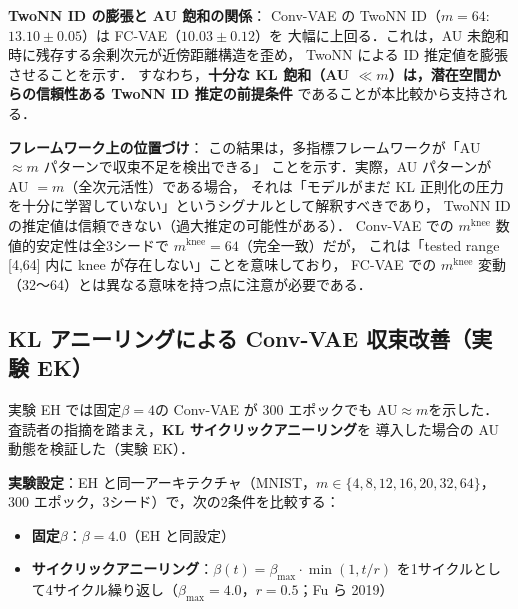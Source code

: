\documentclass[11pt,a4paper]{jsarticle}
\newcommand{\mknee}{m^{\mathrm{knee}}}
\begin{document}
\textbf{TwoNN ID の膨張と AU 飽和の関係}：
Conv-VAE の TwoNN ID（$m=64$: $13.10 \pm 0.05$）は FC-VAE（$10.03 \pm 0.12$）を
大幅に上回る．これは，AU 未飽和時に残存する余剰次元が近傍距離構造を歪め，
TwoNN による ID 推定値を膨張させることを示す．
すなわち，\textbf{十分な KL 飽和（AU $\ll m$）は，潜在空間からの信頼性ある TwoNN ID 推定の前提条件}
であることが本比較から支持される．

\textbf{フレームワーク上の位置づけ}：
この結果は，多指標フレームワークが「AU $\approx m$ パターンで収束不足を検出できる」
ことを示す．実際，AU パターンが AU $= m$（全次元活性）である場合，
それは「モデルがまだ KL 正則化の圧力を十分に学習していない」というシグナルとして解釈すべきであり，
TwoNN ID の推定値は信頼できない（過大推定の可能性がある）．
Conv-VAE での $\mknee$ 数値的安定性は全3シードで $\mknee=64$（完全一致）だが，
これは「tested range [4,64] 内に knee が存在しない」ことを意味しており，
FC-VAE での $\mknee$ 変動（32〜64）とは異なる意味を持つ点に注意が必要である．

\subsection{KL アニーリングによる Conv-VAE 収束改善（実験 EK）}\label{sec:exp_annealing}

実験 EH では固定$\beta=4$の Conv-VAE が 300 エポックでも AU$\approx m$を示した．
査読者の指摘を踏まえ，\textbf{KL サイクリックアニーリング}\cite{fu2019cyclical}を
導入した場合の AU 動態を検証した（実験 EK）．

\textbf{実験設定}：EH と同一アーキテクチャ（MNIST，$m \in \{4, 8, 12, 16, 20, 32, 64\}$，
300 エポック，3シード）で，次の2条件を比較する：
\begin{itemize}
  \item \textbf{固定$\beta$}：$\beta = 4.0$（EH と同設定）
  \item \textbf{サイクリックアニーリング}：$\beta(t) = \beta_{\max} \cdot \min(1, t/r)$
        を1サイクルとして4サイクル繰り返し（$\beta_{\max}=4.0$，$r=0.5$；Fu ら 2019\cite{fu2019cyclical}）
\end{itemize}
\end{document}
